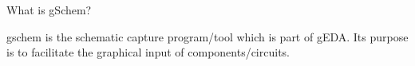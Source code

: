  What is gSchem? 

  gschem is the schematic capture program/tool which is part of gEDA. Its purpose is to facilitate the graphical input of components/circuits.

